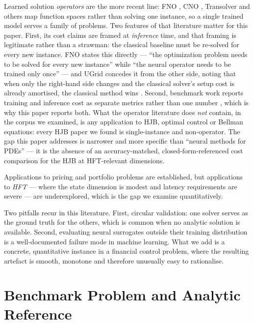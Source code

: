\documentclass[conference]{IEEEtran}
\begin{document}
Learned solution \emph{operators} are the more recent line: FNO \cite{li2021fourier,li2023neural},
CNO \cite{raonic2023convolutional}, Transolver \cite{wu2024transolver} and others map function
spaces rather than solving one instance, so a single trained model serves a family of problems.
Two features of that literature matter for this paper. First, its cost claims are framed at
\emph{inference} time, and that framing is legitimate rather than a strawman: the classical
baseline must be re-solved for every new instance. FNO states this directly --- ``the optimization
problem needs to be solved for every new instance'' while ``the neural operator needs to be
trained only once'' --- and UGrid concedes it from the other side, noting that when only the
right-hand side changes and the classical solver's setup cost is already amortised, the classical
method wins \cite{han2024ugrid}. Second, benchmark work reports training
and inference cost as separate metrics rather than one number \cite{pdenneval2024}, which is why
this paper reports both. What the operator literature does \emph{not} contain, in the corpus we
examined, is any application to HJB, optimal control or Bellman equations: every HJB paper we
found is single-instance and non-operator. The gap this paper addresses is narrower and more
specific than ``neural methods for PDEs'' --- it is the absence of an accuracy-matched,
closed-form-referenced cost comparison for the HJB at HFT-relevant dimensions.

Applications to pricing and portfolio problems are established, but applications to \emph{HFT} ---
where the state dimension is modest and latency requirements are severe --- are
underexplored, which is the gap we examine quantitatively.

Two pitfalls recur in this literature. First, circular validation: one solver serves as the ground
truth for the others, which is common when no analytic solution is available. Second, evaluating
neural surrogates outside their training distribution is a well-documented failure mode in machine
learning. What we add is a concrete, quantitative
instance in a financial control problem, where the resulting artefact is smooth, monotone and
therefore unusually easy to rationalise.

\section{Benchmark Problem and Analytic Reference}\label{sec:bench}
\end{document}
